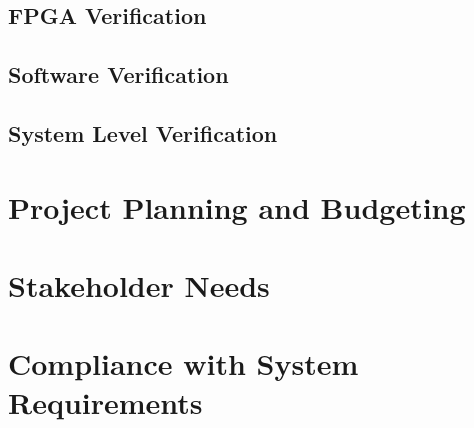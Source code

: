 \documentclass[letterpaper,11pt]{article}
\begin{document}
\subsection{FPGA Verification} %
\subsection{Software Verification} %
\subsection{System Level Verification} %

\section{Project Planning and Budgeting} %

\section{Stakeholder Needs} %


\section{Compliance with System Requirements} %
\end{document}
